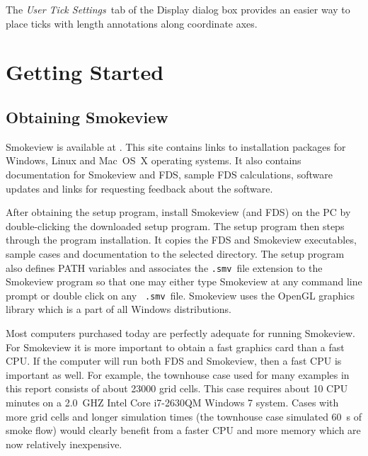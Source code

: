 \documentclass[11pt,twoside]{book}
\begin{document}
The {\em User Tick Settings}\ tab of the Display dialog box
provides an easier way to place ticks with length annotations
along coordinate axes.



\section{Getting Started}

\subsection{Obtaining Smokeview}

Smokeview is available at .
This site contains links to installation packages for
Windows, Linux and Mac~OS~X operating systems. It also contains documentation for
Smokeview and FDS, sample FDS calculations, software updates and
links for requesting feedback about the software.

After obtaining the setup program, install Smokeview (and FDS)  on the PC by
double-clicking the downloaded
setup program. The setup program then steps through the
program installation. It copies the FDS and Smokeview executables,
sample cases and documentation to the selected directory.  The setup program also
defines PATH variables and associates the {\tt .smv}\ file
extension to the Smokeview program so that one may either type
Smokeview at any command line prompt or double click on any {\tt
.smv}\ file. Smokeview uses the OpenGL graphics library which is a
part of all Windows distributions.

Most computers purchased today are perfectly adequate for running
Smokeview. For Smokeview it is more important to obtain a fast
graphics card than a fast CPU. If the computer will run both FDS
and Smokeview, then a fast CPU is important as well.
For example, the townhouse case used for many examples in this
report consists of about 23000 grid cells.  This case requires
about 10 CPU minutes on a 2.0~GHZ Intel Core i7-2630QM Windows 7
system. Cases with more grid cells and longer simulation times
(the townhouse case simulated 60~s of smoke flow) would clearly
benefit from a faster CPU and more memory which are now relatively
inexpensive.
\end{document}
